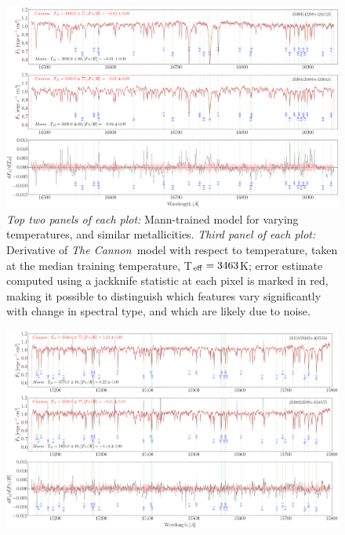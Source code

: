\documentclass[twocolumn]{aastex62}
\newcommand{\thecannon}{\textsl{The Cannon}}
\begin{document}
\begin{figure}[]
	\begin{center}
	\includegraphics[width=16cm]{demo_derivatives_teff3.png}
	\end{center}
	\caption{\textit{Top two panels of each plot:} Mann-trained model for varying temperatures, and similar metallicities. \textit{Third panel of each plot:} Derivative of \thecannon\ model with respect to temperature, taken at the median training temperature, T$_{\rm eff}=3463$K; error estimate computed using a jackknife statistic at each pixel is marked in red, making it possible to distinguish which features vary significantly with change in spectral type, and which are likely due to noise.}
	\label{fig:demo_teff}
\end{figure}

\begin{figure}[]
	\begin{center}
	\includegraphics[width=16cm]{demo_derivatives_feh1.png}
	\end{center}
\end{figure}
\end{document}
